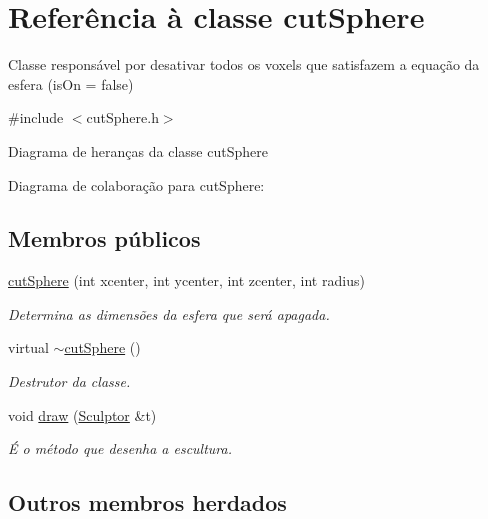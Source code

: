 \hypertarget{classcut_sphere}{}\section{Referência à classe cut\+Sphere}
\label{classcut_sphere}


Classe responsável por desativar todos os voxels que satisfazem a equação da esfera (is\+On = false)  




{\ttfamily \#include $<$cut\+Sphere.\+h$>$}



Diagrama de heranças da classe cut\+Sphere


Diagrama de colaboração para cut\+Sphere\+:
\subsection*{Membros públicos}
\begin{DoxyCompactItemize}
\item 
\hyperlink{classcut_sphere_a3eaf7643a0e001270890a784c26ac5c0}{cut\+Sphere} (int xcenter, int ycenter, int zcenter, int radius)
\begin{DoxyCompactList}\small\item\em Determina as dimensões da esfera que será apagada. \end{DoxyCompactList}\item 
\mbox{\label{classcut_sphere_a1da42def38732a7da7430ad0a8fbf827}} 
virtual \hyperlink{classcut_sphere_a1da42def38732a7da7430ad0a8fbf827}{$\sim$cut\+Sphere} ()
\begin{DoxyCompactList}\small\item\em Destrutor da classe. \end{DoxyCompactList}\item 
void \hyperlink{classcut_sphere_a98c142b869487cc6a0531f6bfca8462a}{draw} (\hyperlink{class_sculptor}{Sculptor} \&t)
\begin{DoxyCompactList}\small\item\em É o método que desenha a escultura. \end{DoxyCompactList}\end{DoxyCompactItemize}
\subsection*{Outros membros herdados}


